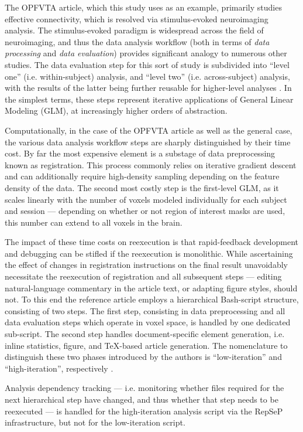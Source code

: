 The OPFVTA article, which this study uses as an example, primarily studies effective connectivity, which is resolved via stimulus-evoked neuroimaging analysis.
The stimulus-evoked paradigm is widespread across the field of neuroimaging, and thus the data analysis workflow (both in terms of \emph{data processing} and \emph{data evaluation}) provides significant analogy to numerous other studies.
The data evaluation step for this sort of study is subdivided into “level one” (i.e. within-subject) analysis, and “level two” (i.e. across-subject) analysis, with the results of the latter being further reusable for higher-level analyses \cite{Friston1995}.
In the simplest terms, these steps represent iterative applications of General Linear Modeling (GLM), at increasingly higher orders of abstraction.

Computationally, in the case of the OPFVTA article as well as the general case, the various data analysis workflow steps are sharply distinguished by their time cost.
By far the most expensive element is a substage of data preprocessing known as registration.
This process commonly relies on iterative gradient descent and can additionally require high-density sampling depending on the feature density of the data.
The second most costly step is the first-level GLM, as it scales linearly with the number of voxels modeled individually for each subject and session — depending on whether or not region of interest masks are used, this number can extend to all voxels in the brain.

The impact of these time costs on reexecution is that rapid-feedback development and debugging can be stifled if the reexecution is monolithic.
While ascertaining the effect of changes in registration instructions on the final result unavoidably necessitate the reexecution of registration and all subsequent steps — editing natural-language commentary in the article text, or adapting figure styles, should not.
To this end the reference article employs a hierarchical Bash-script structure, consisting of two steps.
The first step, consisting in data preprocessing and all data evaluation steps which operate in voxel space, is handled by one dedicated sub-script.
The second step handles document-specific element generation, i.e. inline statistics, figure, and TeX-based article generation.
The nomenclature to distinguish these two phases introduced by the authors is “low-iteration” and “high-iteration”, respectively \cite{repsep}.

Analysis dependency tracking — i.e. monitoring whether files required for the next hierarchical step have changed, and thus whether that step needs to be reexecuted — is handled for the high-iteration analysis script via the RepSeP infrastructure, but not for the low-iteration script.


